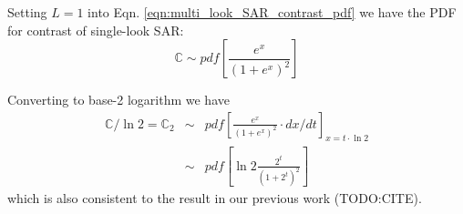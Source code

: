 \documentclass[journal]{IEEEtran}
\begin{document}
Setting $L=1$ into Eqn. \ref{eqn:multi_look_SAR_contrast_pdf} 
we have the PDF for contrast of single-look SAR:
\begin{equation}
  \mathbb{C} \sim pdf \left[ \frac{e^{x}}{(1+e^x)^{2}} \right]
\end{equation}

Converting to base-2 logarithm we have
\begin{eqnarray*}
  \mathbb{C} / \ln{2} = \mathbb{C}_2 &\sim& pdf \left[ \frac{e^{x}}{(1+e^x)^{2}} \cdot dx/dt \right]_{x=t \cdot \ln{2}} \\
     &\sim& pdf \left[ \ln{2} \frac{2^t}{(1+2^t)^{2}}  \right] 
\end{eqnarray*}
which is also consistent to the result in our previous work (TODO:CITE).



\end{document}

